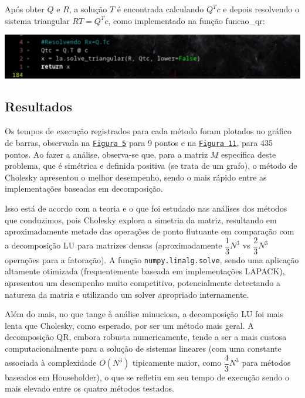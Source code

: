 \documentclass{article}
\begin{document}
    Após obter $Q$ e $R$, a solução $T$ é encontrada calculando $Q^T c$ e depois resolvendo o sistema triangular $RT = Q^T c$, como implementado na função funcao\_qr:

    \begin{center}
    \includegraphics[width=0.8\linewidth]{imgs/qr_2.png}
    \end{center}

    \hypertarget{1}{}
    \hypertarget{5}{}

    \subsection{Resultados}

    Os tempos de execução registrados para cada método foram plotados no gráfico de barras, observada na \hyperlink{2}{\texttt{Figura 5}} para 9 pontos e na \hyperlink{6}{\texttt{Figura 11}}, para 435 pontos. Ao fazer a análise, observa-se que, para a matriz $M$ específica deste problema, que é simétrica e definida positiva (se trata de um grafo), o método de Cholesky apresentou o melhor desempenho, sendo o mais rápido entre as implementações baseadas em decomposição.

    Isso está de acordo com a teoria e o que foi estudado nas análises dos métodos que conduzimos, pois Cholesky explora a simetria da matriz, resultando em aproximadamente metade das operações de ponto flutuante em comparação com a decomposição LU para matrizes densas (aproximadamente $\dfrac{1}{3}N^3$ vs $\dfrac{2}{3}N^3$ operações para a fatoração). A função \texttt{numpy.linalg.solve}, sendo uma aplicação altamente otimizada (frequentemente baseada em implementações LAPACK), apresentou um desempenho muito competitivo, potencialmente detectando a natureza da matriz e utilizando um solver apropriado internamente.

    Além do mais, no que tange à análise minuciosa, a decomposição LU foi mais lenta que Cholesky, como esperado, por ser um método mais geral. A decomposição QR, embora robusta numericamente, tende a ser a mais custosa computacionalmente para a solução de sistemas lineares (com uma constante associada à complexidade $O(N^3)$ tipicamente maior, como $\dfrac{4}{3}N^3$ para métodos baseados em Householder), o que se refletiu em seu tempo de execução sendo o mais elevado entre os quatro métodos testados.
\end{document}
